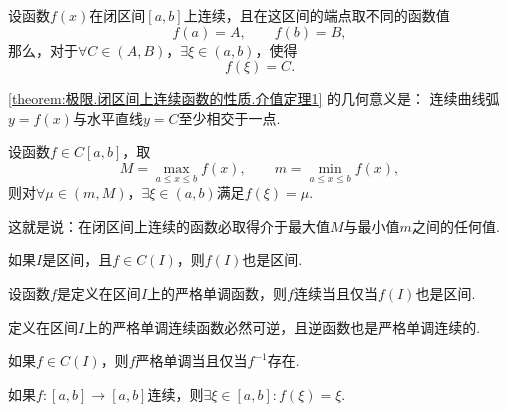 \begin{theorem}[介值定理]\label{theorem:极限.闭区间上连续函数的性质.介值定理1}
设函数\(f(x)\)在闭区间\([a,b]\)上连续，且在这区间的端点取不同的函数值\[
f(a) = A, \qquad
f(b) = B,
\]那么，对于\(\forall C \in (A,B)\)，\(\exists \xi \in (a,b)\)，使得\[
f(\xi) = C.
\]
\end{theorem}
\cref{theorem:极限.闭区间上连续函数的性质.介值定理1} 的几何意义是：
连续曲线弧\(y=f(x)\)与水平直线\(y=C\)至少相交于一点.

\begin{corollary}\label{theorem:极限.闭区间上连续函数的性质.介值定理2}
设函数\(f \in C[a,b]\)，取\[
M=\max_{a \leq x \leq b} f(x), \qquad
m=\min_{a \leq x \leq b} f(x),
\]则对\(\forall\mu\in(m,M)\)，\(\exists\xi\in(a,b)\)满足\(f(\xi)=\mu\).
\end{corollary}
这就是说：在闭区间上连续的函数必取得介于最大值\(M\)与最小值\(m\)之间的任何值.

\begin{corollary}
如果\(I\)是区间，且\(f\in C(I)\)，则\(f(I)\)也是区间.
\end{corollary}

\begin{corollary}
设函数\(f\)是定义在区间\(I\)上的严格单调函数，则\(f\)连续当且仅当\(f(I)\)也是区间.
\end{corollary}

\begin{corollary}
定义在区间\(I\)上的严格单调连续函数必然可逆，且逆函数也是严格单调连续的.
\end{corollary}

\begin{corollary}
如果\(f \in C(I)\)，则\(f\)严格单调当且仅当\(f^{-1}\)存在.
\end{corollary}

\begin{corollary}
如果\(f\colon[a,b]\to[a,b]\)连续，则\(\exists\xi\in[a,b]: f(\xi)=\xi\).
\end{corollary}

